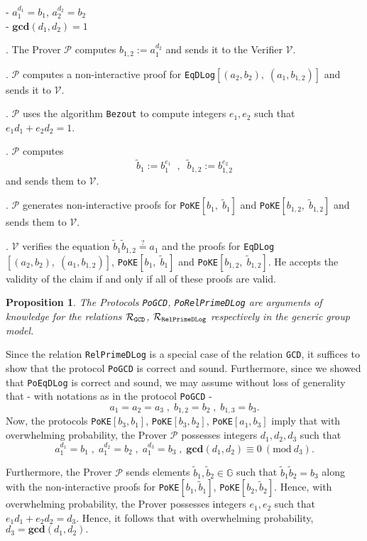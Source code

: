 \documentclass[11pt, lettersize, notitlepage, leqno, footskip=0.6cm]{article}
\newcommand{\wti}{\widetilde}
\newcommand{\mc}{\mathcal}
\newcommand{\mb}{\mathbb}
\newcommand{\mbf}{\mathbf}
\newcommand{\mP}{\mc{P}}
\newcommand{\V}{\mc{V}}
\newcommand{\vs}{\vspace{-0.15cm}}
\newcommand{\noin}{\noindent}
\newcommand{\op}{overwhelming probability}
\newcommand{\Mod}[1]{\ (\mathrm{mod}\ #1)}
\newcommand{\GCD}{\mbf{gcd}}
\newtheorem{Prop}[Thm]{Proposition}
\numberwithin{equation}{section}
\begin{document}
\noindent - $a_1^{d_1} = b_1$, $a_2^{d_2} = b_2$\\
\noindent - $\GCD(d_1, d_2) = 1$
 

\begin{prf1} . The Prover $\mc{P}$ computes $b_{1,2}:= a_1^{d_2}$ and sends it to the Verifier $\V$. 

. $\mP$ computes a non-interactive proof for \verb|EqDLog|$[(a_2, b_2),\; (a_1, b_{1,2})]$ and sends it to $\mc{V}$.

. $\mc{P}$ uses the algorithm \verb|Bezout|  to compute integers $e_1, e_2$ such that $e_1d_1 + e_2d_2 = 1$.

\noin 4. $\mc{P}$ computes \vs $$\wti{b}_1:= b_1^{e_1}\;\;,\;\; \wti{b}_{1,2}:= b_{1,2}^{e_2} $$ and sends them to $\V$. 

\noin 5. $\mP$ generates non-interactive proofs for \verb|PoKE|$[b_1,\; \wti{b}_1]$ and \verb|PoKE|$[b_{1,2},\; \wti{b}_{1,2}]$ and sends them to $\mc{V}$.

. $\mc{V}$ verifies the equation $\wti{b}_1\wti{b}_{1,2}\stackrel{?}{=} a_1$ and the proofs for \verb|EqDLog|$[(a_2, b_2),\; (a_1, b_{1,2})]$, \verb|PoKE|$[b_1,\; \wti{b}_1]$ and \verb|PoKE|$[b_{1,2},\; \wti{b}_{1,2}]$. He accepts the validity of the claim if and only if all of these proofs are valid.\end{prf1}

\vspace{0.2cm}

\begin{Prop} The Protocols \verb|PoGCD|, \verb|PoRelPrimeDLog| are arguments of knowledge for the relations $\mc{R}_{{\tt{GCD}}}$, $\mc{R}_{{\tt{RelPrimeDLog}}}$ respectively in the generic group model.\end{Prop}

\begin{prf} Since the relation \verb|RelPrimeDLog| is a special case of the relation \verb|GCD|, it suffices to show that the protocol \verb|PoGCD| is correct and sound. Furthermore, since we showed that \verb|PoEqDLog| is correct and sound, we may assume without loss of generality that - with notations as in the protocol \verb|PoGCD| - \vs $$a_1 = a_2 = a_3\;,\; {b}_{1,2} = b_2\;,\;{b}_{1,3} = b_3 .$$ Now, the protocols \verb|PoKE|$[b_3, b_1]$, \verb|PoKE|$[b_3, b_2]$, \verb|PoKE|$[a_1, b_3]$ imply that with \op, the Prover $\mP$ possesses integers $d_1,d_2,d_3$ such that \vs $$a_1^{d_1} = b_1\;,\;a_1^{d_2} = b_2\;,\;a_1^{d_3} = b_3\;,\;\GCD(d_1,d_2)\equiv 0\Mod{d_3}.$$ 

Furthermore, the Prover $\mP$ sends elements $\wti{b}_1, \wti{b}_2\in \mb{G}$ such that $\wti{b}_1\wti{b}_2 = b_3$ along with the non-interactive proofs for \verb|PoKE|$[b_1,\wti{b}_1]$, \verb|PoKE|$[b_2,\wti{b}_2]$. Hence, with \op, the Prover possesses integers $e_1,e_2$ such that $e_1d_1+e_2d_2 = d_3$. Hence, it follows that with \op, $d_3 = \GCD(d_1,d_2).$ 
\end{prf}
\end{document}
